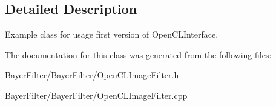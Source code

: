 \subsection{Detailed Description}
Example class for usage first version of Open\-C\-L\-Interface. 

The documentation for this class was generated from the following files\-:\begin{DoxyCompactItemize}
\item 
Bayer\-Filter/\-Bayer\-Filter/Open\-C\-L\-Image\-Filter.\-h\item 
Bayer\-Filter/\-Bayer\-Filter/Open\-C\-L\-Image\-Filter.\-cpp\end{DoxyCompactItemize}
